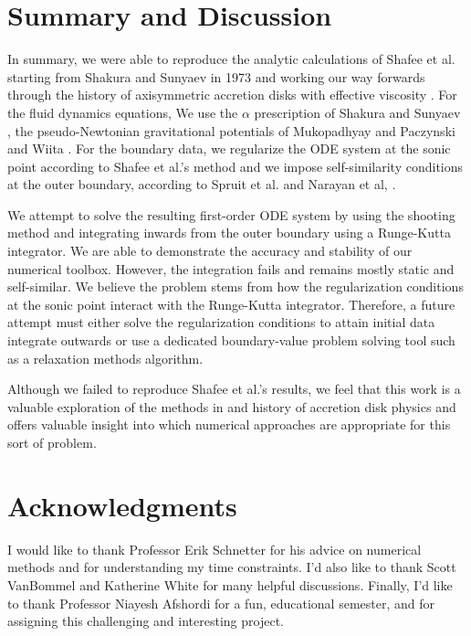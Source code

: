 \documentclass[]{article}
\begin{document}
\section{Summary and Discussion}
\label{sec:conclusion}

In summary, we were able to reproduce the analytic calculations of
Shafee et al. \cite{Shafee08} starting from Shakura and Sunyaev in
1973 \cite{ShakuraSunyaev73} and working our way forwards through the
history of axisymmetric accretion disks with effective viscosity
\cite{PBK81,MuchotrzebPaczynski82,Kato88a,Abramowicz88,PophamNarayan91,NarayanPopham93,ChenTaam93,Narayan97,Chen97,AfshordiPaczynski03,NarayanYi94}. For
the fluid dynamics equations, We use the $\alpha$ prescription of
Shakura and Sunyaev \cite{ShakuraSunyaev73}, the pseudo-Newtonian
gravitational potentials of Mukopadhyay \cite{Mukhopadhyay02} and
Paczynski and Wiita \cite{PW80}. For the boundary data, we regularize
the ODE system at the sonic point according to Shafee et al.'s method
\cite{Shafee08} and we impose self-similarity conditions at the outer
boundary, according to Spruit et al. \cite{Spruit87} and Narayan et
al, \cite{Narayan97}.

We attempt to solve the resulting first-order ODE system by using the
shooting method and integrating inwards from the outer boundary using
a Runge-Kutta integrator. We are able to demonstrate the accuracy and
stability of our numerical toolbox. However, the integration fails and
remains mostly static and self-similar. We believe the problem stems
from how the regularization conditions at the sonic point interact
with the Runge-Kutta integrator. Therefore, a future attempt must
either solve the regularization conditions to attain initial data
integrate outwards or use a dedicated boundary-value problem solving
tool such as a relaxation methods algorithm.

Although we failed to reproduce Shafee et al.'s results, we feel that
this work is a valuable exploration of the methods in and history of
accretion disk physics and offers valuable insight into which
numerical approaches are appropriate for this sort of problem.

\section{Acknowledgments}
\label{sec:acknowledgments}

I would like to thank Professor Erik Schnetter for his advice on
numerical methods and for understanding my time constraints. I'd also
like to thank Scott VanBommel and Katherine White for many helpful
discussions. Finally, I'd like to thank Professor Niayesh Afshordi for
a fun, educational semester, and for assigning this challenging and
interesting project.
\end{document}
